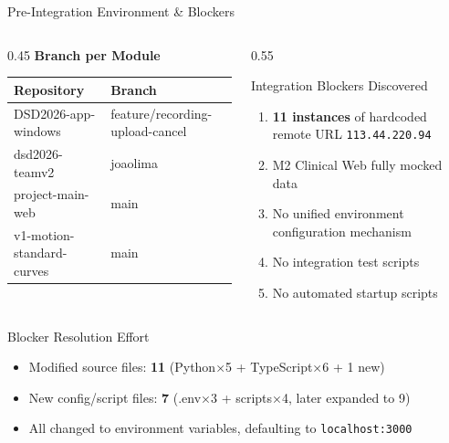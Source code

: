 \documentclass[aspectratio=169,utf8,11pt]{beamer}
\begin{document}
\begin{frame}{Pre-Integration Environment \& Blockers}
  \begin{columns}[T]
    \begin{column}{0.45\textwidth}
      \textbf{Branch per Module}
      \begin{table}[h]
        \tiny
        \begin{tabular}{ll}
          \toprule
          \textbf{Repository} & \textbf{Branch} \\
          \midrule
          DSD2026-app-windows & feature/recording-upload-cancel \\
          dsd2026-teamv2 & joaolima \\
          project-main-web & main \\
          v1-motion-standard-curves & main \\
          \bottomrule
        \end{tabular}
      \end{table}
    \end{column}
    \begin{column}{0.55\textwidth}
      \begin{alertblock}{Integration Blockers Discovered}
        \begin{enumerate}
          \item \textbf{11 instances} of hardcoded remote URL \texttt{113.44.220.94}
          \item M2 Clinical Web fully mocked data
          \item No unified environment configuration mechanism
          \item No integration test scripts
          \item No automated startup scripts
        \end{enumerate}
      \end{alertblock}
    \end{column}
  \end{columns}

  \begin{block}{Blocker Resolution Effort}
    \begin{itemize}
      \item Modified source files: \textbf{11} (Python×5 + TypeScript×6 + 1 new)
      \item New config/script files: \textbf{7} (.env×3 + scripts×4, later expanded to 9)
      \item All changed to environment variables, defaulting to \texttt{localhost:3000}
    \end{itemize}
  \end{block}
\end{frame}
\end{document}
